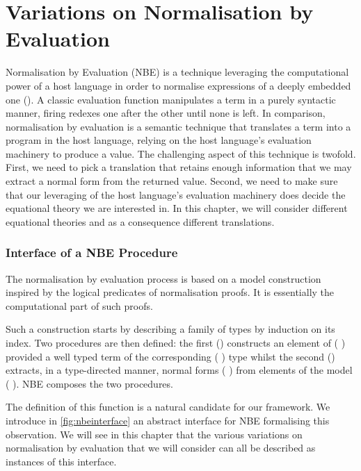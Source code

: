 \chapter{Variations on Normalisation by Evaluation}
\label{sec:variationsnormalisation}

Normalisation by Evaluation (NBE) is a technique leveraging the computational
power of a host language in order to normalise expressions of a deeply
embedded one (\cite{berger1991inverse,berger1993program,CoqDybSK,coquand2002formalised}).
A classic evaluation function manipulates a term in a purely syntactic manner,
firing redexes one after the other until none is left. In comparison,
normalisation by evaluation is a semantic technique that translates a term
into a program in the host language, relying on the host language's evaluation
machinery to produce a value. The challenging aspect of this technique is twofold.
First, we need to pick a translation that retains enough information that we
may extract a normal form from the returned value. Second, we need to make sure
that our leveraging of the host language's evaluation machinery does decide the
equational theory we are interested in. In this chapter, we will consider different
equational theories and as a consequence different translations.

\subsection{Interface of a NBE Procedure}

The normalisation by evaluation process is based on a model construction
inspired by the logical predicates of normalisation proofs. It is essentially
the computational part of such proofs.

Such a construction starts by describing a family of types  by
induction on its  index. Two procedures are then defined: the
first () constructs an element of (  )
provided a well typed term of the corresponding (  )
type whilst the second () extracts, in a type-directed manner,
normal forms (  ) from elements of the model
(  ). NBE composes the two procedures.

The definition of this  function is a natural candidate for our
 framework. We introduce in \cref{fig:nbeinterface} an abstract
interface for NBE formalising this observation.
%
We will see in this chapter that the various variations on normalisation by
evaluation that we will consider can all be described as instances of this
 interface.

